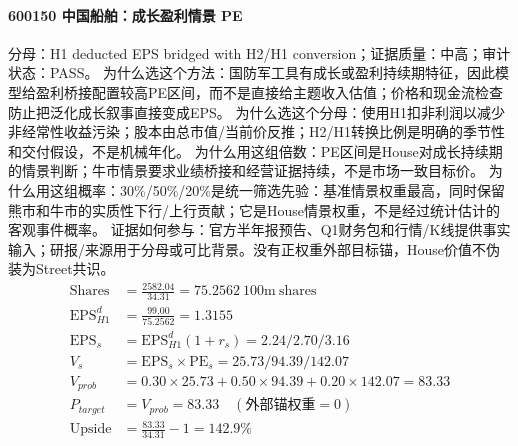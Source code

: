 \paragraph{600150 中国船舶：成长盈利情景 PE}
分母：H1 deducted EPS bridged with H2/H1 conversion；证据质量：中高；审计状态：PASS。
为什么选这个方法：国防军工具有成长或盈利持续期特征，因此模型给盈利桥接配置较高PE区间，而不是直接给主题收入估值；价格和现金流检查防止把泛化成长叙事直接变成EPS。
为什么选这个分母：使用H1扣非利润以减少非经常性收益污染；股本由总市值/当前价反推；H2/H1转换比例是明确的季节性和交付假设，不是机械年化。
为什么用这组倍数：PE区间是House对成长持续期的情景判断；牛市情景要求业绩桥接和经营证据持续，不是市场一致目标价。
为什么用这组概率：30\%/50\%/20\%是统一筛选先验：基准情景权重最高，同时保留熊市和牛市的实质性下行/上行贡献；它是House情景权重，不是经过统计估计的客观事件概率。
证据如何参与：官方半年报预告、Q1财务包和行情/K线提供事实输入；研报/来源用于分母或可比背景。没有正权重外部目标锚，House价值不伪装为Street共识。
\begin{align*}
\mathrm{Shares} &= \frac{2582.04}{34.31}=75.2562\ \mathrm{100m\ shares}\\
\mathrm{EPS}_{H1}^d &= \frac{99.00}{75.2562}=1.3155\\
\mathrm{EPS}_s &= \mathrm{EPS}_{H1}^d(1+r_s)=2.24/2.70/3.16\\
V_s &= \mathrm{EPS}_s\times \mathrm{PE}_s=25.73/94.39/142.07\\
V_{prob} &= 0.30\times 25.73+0.50\times 94.39+0.20\times 142.07=83.33\\
P_{target} &= V_{prob}=83.33\quad(\text{外部锚权重}=0)\\
\mathrm{Upside} &= \frac{83.33}{34.31}-1=142.9\%\\
\end{align*}

